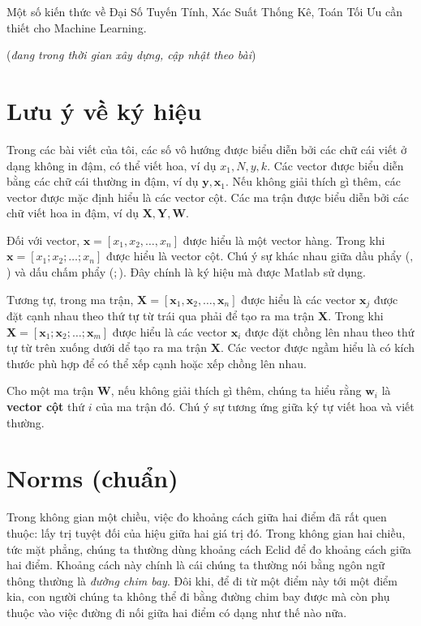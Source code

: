  
Một số kiến thức về Đại Số Tuyến Tính, Xác Suất Thống Kê, Toán Tối Ưu cần thiết cho Machine Learning. 
 
(\textit{đang trong thời gian xây dựng, cập nhật theo bài}) 

\section{Lưu ý về ký hiệu}
 
Trong các bài viết của tôi, các số vô hướng được biểu diễn bởi các chữ cái viết ở dạng không in đậm, có thể viết hoa, ví dụ $x_1, N, y, k$. Các vector được biểu diễn bằng các chữ cái thường in đậm, ví dụ $\mathbf{y}, \mathbf{x}_1 $. Nếu không giải thích gì thêm, các vector được mặc định hiểu là các vector cột. Các ma trận được biểu diễn bởi các chữ viết hoa in đậm, ví dụ $\mathbf{X, Y, W} $. 
 
Đối với vector, $\mathbf{x} = [x_1, x_2, \dots, x_n]$ được hiểu là một vector hàng. Trong khi $\mathbf{x} = [x_1; x_2; \dots; x_n] $ được hiểu là vector cột. Chú ý sự khác nhau giữa dầu phẩy ($,$) và dấu chấm phẩy ($;$). Đây chính là ký hiệu mà được Matlab sử dụng. 
 
Tương tự, trong ma trận, $\mathbf{X} = [\mathbf{x}_1, \mathbf{x}_2, \dots, \mathbf{x}_n]$ được hiểu là các vector $\mathbf{x}_j$ được đặt cạnh nhau theo thứ tự từ trái qua phải để tạo ra ma trận $\mathbf{X}$. Trong khi $\mathbf{X} = [\mathbf{x}_1; \mathbf{x}_2; \dots; \mathbf{x}_m]$ được hiểu là các vector $\mathbf{x}_i$ được đặt chồng lên nhau theo thứ tự từ trên xuống dưới dể tạo ra ma trận $\mathbf{X}$. Các vector được ngầm hiểu là có kích thước phù hợp để có thể xếp cạnh hoặc xếp chồng lên nhau. 
 
Cho một ma trận $\mathbf{W}$, nếu không giải thích gì thêm, chúng ta hiểu rằng $\mathbf{w}_i$ là \textbf{vector cột} thứ $i$ của ma trận đó. Chú ý sự tương ứng giữa ký tự viết hoa và viết thường. 
 
 
\section{Norms (chuẩn)}
Trong không gian một chiều, việc đo khoảng cách giữa hai điểm đã rất quen thuộc: lấy trị tuyệt đối của hiệu giữa hai giá trị đó. Trong không gian hai chiều, tức mặt phẳng, chúng ta thường dùng khoảng cách Eclid để đo khoảng cách giữa hai điểm. Khoảng cách này chính là cái chúng ta thường nói bằng ngôn ngữ thông thường là \textit{đường chim bay}. Đôi khi, để đi từ một điểm này tới một điểm kia, con người chúng ta không thể đi bằng đường chim bay được mà còn phụ thuộc vào việc đường đi nối giữa hai điểm có dạng như thế nào nữa.  
 
